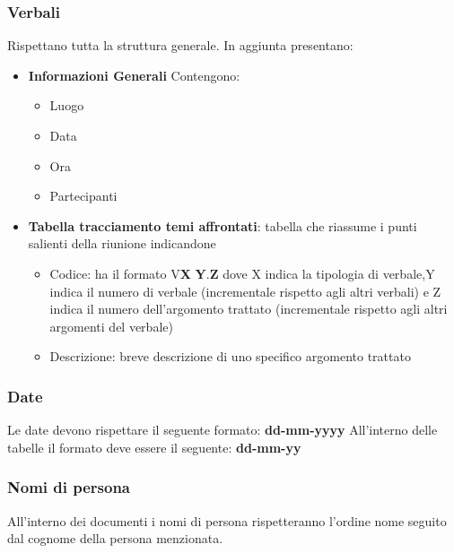 \subsubsection{Verbali}
Rispettano tutta la struttura generale.
In aggiunta presentano:
\begin{itemize} 
    \item \textbf{Informazioni Generali}
    Contengono:
    \begin{itemize} 
        \item Luogo
        \item Data
        \item Ora
        \item Partecipanti
    \end{itemize}
\item \textbf{Tabella tracciamento temi affrontati}:
tabella che riassume i punti salienti della riunione indicandone
    \begin{itemize} 
        \item Codice: ha il formato V\textbf{X} \textbf{Y}.\textbf{Z} dove X indica la tipologia di verbale,Y indica il numero di verbale (incrementale rispetto agli altri verbali) 
        e Z indica il numero dell'argomento trattato (incrementale rispetto agli altri argomenti del verbale) 
        \item Descrizione: breve descrizione di uno specifico argomento trattato
    \end{itemize}

\end{itemize}

\subsubsection{Date}
Le date devono rispettare il seguente formato: \textbf{dd-mm-yyyy}
All'interno delle tabelle il formato deve essere il seguente: \textbf{dd-mm-yy}
\subsubsection{Nomi di persona}
All'interno dei documenti i nomi di persona rispetteranno l'ordine nome seguito dal cognome della persona menzionata.